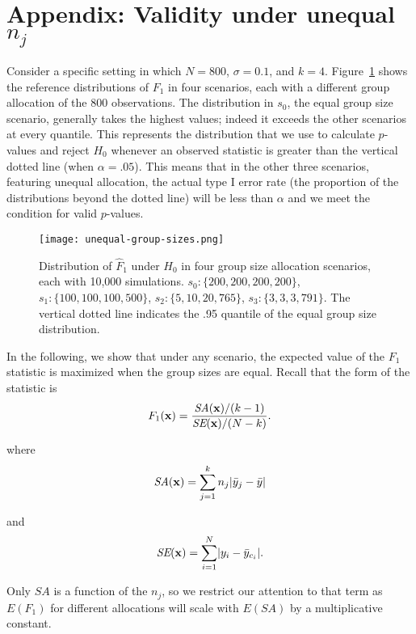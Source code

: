 \section{Appendix: Validity under unequal $n_j$}\label{app:unequal}

Consider a specific setting in which $N = 800$, $\sigma = 0.1$, and $k = 4$. Figure~\ref{Fig:unequal-group-sizes} shows the reference distributions of $F_1$ in four scenarios, each with a different group allocation of the 800 observations. The distribution in $s_0$, the equal group size scenario, generally takes the highest values; indeed it exceeds the other scenarios at every quantile. This represents the distribution that we use to calculate $p$-values and reject $H_0$ whenever an observed statistic is greater than the vertical dotted line (when $\alpha = .05$). This means that in the other three scenarios, featuring unequal allocation, the actual type I error rate (the proportion of the distributions beyond the dotted line) will be less than $\alpha$ and we meet the condition for valid $p$-values.

\begin{figure}
\centering
\texttt{[image: unequal-group-sizes.png]}
\caption{Distribution of $\hat{F}_1$ under $H_0$ in four group size allocation scenarios, each with 10,000 simulations. $s_0\colon \{200, 200, 200, 200 \}$, $s_1\colon \{100, 100, 100, 500 \}$, $s_2\colon \{5, 10, 20, 765 \}$, $s_3\colon \{3, 3, 3, 791 \}$. The vertical dotted line indicates the .95 quantile of the equal group size distribution.\label{Fig:unequal-group-sizes}}
\end{figure}

In the following, we show that under any scenario, the expected value of the $F_1$ statistic is maximized when the group sizes are equal. Recall that the form of the statistic is
$$
F_1(\mathbf{x}) = \frac{\textit{SA}(\mathbf{x})/(k-1)}{\textit{SE}(\mathbf{x})/(N-k)}.
$$

where
\begin{equation*}
\textit{SA}(\mathbf{x}) = \sum_{j=1}^k n_j |\bar{y}_j - \bar y|
\end{equation*}

and
\begin{equation*}
\textit{SE}(\mathbf{x}) = \sum_{i=1}^N \lvert y_{i} - \bar{y}_{c_i} \rvert.
\end{equation*}

Only $SA$ is a function of the $n_j$, so we restrict our attention to that term as $E(F_1)$ for different allocations will scale with $E(SA)$ by a multiplicative constant.

